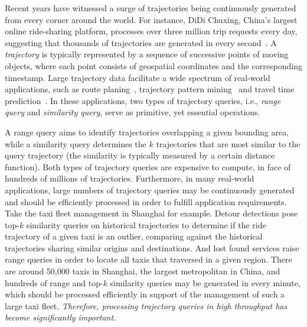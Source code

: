 \documentclass[10pt,conference,letterpaper]{IEEEtran}
\begin{document}
Recent years have witnessed a surge of trajectories being continuously generated from every corner around the world.
For instance, DiDi Chuxing, China's largest online ride-sharing platform, processes over three million trip requests every day, suggesting that thousands of trajectories are generated in every second~\cite{DidiExample}.
A \emph{trajectory} is typically represented by a sequence of successive points of moving objects, where each point consists of geospatial coordinates and the corresponding timestamp.
Large trajectory data facilitate a wide spectrum of real-world applications, such as route planing~\cite{RoutePlan}, trajectory pattern mining~\cite{DBLP:journals/tkde/ZhengZYSZ14} and travel time prediction~\cite{DBLP:conf/gis/LeeSCC12}.
In these applications, two types of trajectory queries, i.e., \emph{range query} and \emph{similarity query}, serve as primitive, yet essential operations.

A range query aims to identify trajectories overlapping a given bounding area, while a similarity query determines the $k$ trajectories that are most similar to the query trajectory (the similarity is typically measured by a certain distance function).
Both types of trajectory queries are expensive to compute, in face of hundreds of millions of trajectories.
Furthermore, in many real-world applications, large numbers of trajectory queries may be continuously generated and should be efficiently processed in order to fulfill application requirements. Take the taxi fleet management in Shanghai for example. Detour detections pose top-$k$ similarity queries on historical trajectories to determine if the ride trajectory of a given taxi is an outlier, comparing against the historical trajectories sharing similar origins and destinations. And lost found services raise range queries in order to locate all taxis that traversed in a given region. There are around 50,000 taxis in Shanghai, the largest metropolitan in China, and hundreds of range and top-$k$ similarity queries may be generated in every minute, which should be processed efficiently in support of the management of such a large taxi fleet. \emph{Therefore, processing trajectory queries in high throughput has become significantly important.}
\end{document}
